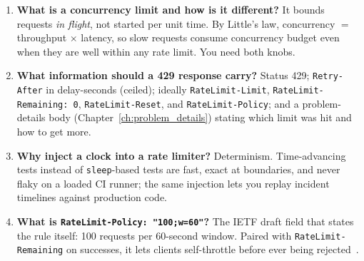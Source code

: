 \begin{enumerate}[label=\textbf{Q\arabic*.}, leftmargin=1.6cm]
        $1/R$ of a client's traffic, so the effective limit becomes
        $R \times$ the configured one --- and it varies with routing
        stickiness. Shared state (a Redis cell) or a deliberately
        partitioned local budget ($\mathrm{limit}/R$) is required.
  \item \textbf{What is a concurrency limit and how is it different?}
        It bounds requests \emph{in flight}, not started per unit time. By
        Little's law, concurrency $=$ throughput $\times$ latency, so slow
        requests consume concurrency budget even when they are well within
        any rate limit. You need both knobs.
  \item \textbf{What information should a 429 response carry?}
        Status 429; \texttt{Retry-After} in delay-seconds (ceiled);
        ideally \texttt{RateLimit-Limit}, \texttt{RateLimit-Remaining: 0},
        \texttt{RateLimit-Reset}, and \texttt{RateLimit-Policy}; and a
        problem-details body (Chapter~\ref{ch:problem_details}) stating
        which limit was hit and how to get more.
  \item \textbf{Why inject a clock into a rate limiter?}
        Determinism. Time-advancing tests instead of \texttt{sleep}-based
        tests are fast, exact at boundaries, and never flaky on a loaded CI
        runner; the same injection lets you replay incident timelines
        against production code.
  \item \textbf{What is \texttt{RateLimit-Policy: "100;w=60"}?}
        The IETF draft field that states the rule itself: 100 requests per
        60-second window. Paired with \texttt{RateLimit-Remaining} on
        successes, it lets clients self-throttle before ever being
        rejected~\cite{ietf_ratelimit_headers}.
\end{enumerate}


